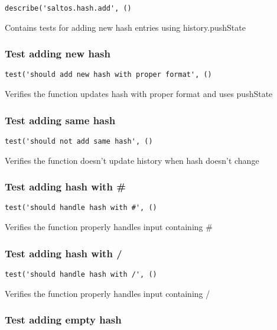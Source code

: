 \documentclass[a4paper]{article}
\begin{document}
\begin{lstlisting}
describe('saltos.hash.add', ()
\end{lstlisting}

Contains tests for adding new hash entries
using history.pushState

\hypertarget{toc210}{}
\subsubsection{Test adding new hash}

\begin{lstlisting}
test('should add new hash with proper format', ()
\end{lstlisting}

Verifies the function updates hash with proper format
and uses pushState

\hypertarget{toc211}{}
\subsubsection{Test adding same hash}

\begin{lstlisting}
test('should not add same hash', ()
\end{lstlisting}

Verifies the function doesn't update history when hash doesn't change

\hypertarget{toc212}{}
\subsubsection{Test adding hash with \#}

\begin{lstlisting}
test('should handle hash with #', ()
\end{lstlisting}

Verifies the function properly handles input containing \#

\hypertarget{toc213}{}
\subsubsection{Test adding hash with /}

\begin{lstlisting}
test('should handle hash with /', ()
\end{lstlisting}

Verifies the function properly handles input containing /

\hypertarget{toc214}{}
\subsubsection{Test adding empty hash}
\end{document}
